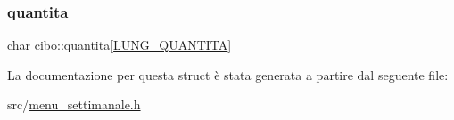 \mbox{\label{structcibo_a784c3494d6b72efd717567db1c59380a}} 
\subsubsection{\texorpdfstring{quantita}{quantita}}
{\footnotesize\ttfamily char cibo\+::quantita\mbox{[}\hyperlink{menu__settimanale_8h_af69c340c57cfdd29bd5cec6848afbf16}{L\+U\+N\+G\+\_\+\+Q\+U\+A\+N\+T\+I\+TA}\mbox{]}}



La documentazione per questa struct è stata generata a partire dal seguente file\+:\begin{DoxyCompactItemize}
\item 
src/\hyperlink{menu__settimanale_8h}{menu\+\_\+settimanale.\+h}\end{DoxyCompactItemize}
